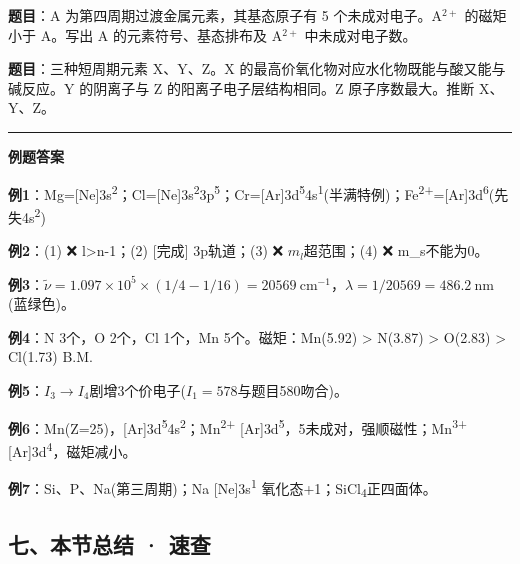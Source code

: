 \textbf{题目}：A 为第四周期过渡金属元素，其基态原子有 5 个未成对电子。A\(^{2+}\) 的磁矩小于 A。写出 A 的元素符号、基态排布及 A\(^{2+}\) 中未成对电子数。

\textbf{题目}：三种短周期元素 X、Y、Z。X 的最高价氧化物对应水化物既能与酸又能与碱反应。Y 的阴离子与 Z 的阳离子电子层结构相同。Z 原子序数最大。推断 X、Y、Z。

\begin{center}\rule{0.5\linewidth}{0.5pt}\end{center}

\textbf{例题答案}

\textbf{例1}：Mg={[}Ne{]}3s\textsuperscript{2}；Cl={[}Ne{]}3s\textsuperscript{2}3p\textsuperscript{5}；Cr={[}Ar{]}3d\textsuperscript{5}4s\textsuperscript{1}(半满特例)；Fe\textsuperscript{2+}={[}Ar{]}3d\textsuperscript{6}(先失4s\textsuperscript{2})

\textbf{例2}：(1) ❌ l\textgreater n-1；(2) {[}完成{]} 3p轨道；(3) ❌ \(m_l\)超范围；(4) ❌ m\_s不能为0。

\textbf{例3}：\(\tilde{\nu}=1.097\times10^5\times(1/4-1/16)=20569\ \mathrm{cm^{-1}}\)，\(\lambda=1/20569=486.2\ \mathrm{nm}\)(蓝绿色)。

\textbf{例4}：N 3个，O 2个，Cl 1个，Mn 5个。磁矩：Mn(5.92) \textgreater{} N(3.87) \textgreater{} O(2.83) \textgreater{} Cl(1.73) B.M.

\textbf{例5}：\(I_3\to I_4\)剧增\箭3个价电子(\(I_1=578\)与题目580吻合)。

\textbf{例6}：Mn(Z=25)，{[}Ar{]}3d\textsuperscript{5}4s\textsuperscript{2}；Mn\textsuperscript{2+} {[}Ar{]}3d\textsuperscript{5}，5未成对，强顺磁性；Mn\textsuperscript{3+} {[}Ar{]}3d\textsuperscript{4}，磁矩减小。

\textbf{例7}：Si、P、Na(第三周期)；Na {[}Ne{]}3s\textsuperscript{1} 氧化态+1；SiCl\textsubscript{4}正四面体。

\subsection{七、本节总结 · 速查}\label{ux4e03ux672cux8282ux603bux7ed3-ux901fux67e5}

